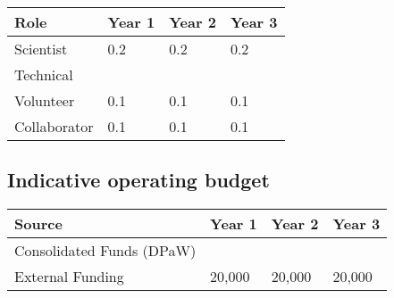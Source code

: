 \documentclass[version=last,
    paper=a4, %
    10pt, %
    usenames,
    dvipsnames,
    oneside, %
    headings=openany, %
    DIV=15 %
]{scrbook}
\begin{document}
\begin{longtabu} to \linewidth { |  X | X | X | X | }
\hline
{}
Role & Year 1 & Year 2 & Year 3\\
\hline
\endhead



Scientist & 0.2 & 0.2 & 0.2\\



Technical &  &  & \\



Volunteer & 0.1 & 0.1 & 0.1\\



Collaborator & 0.1 & 0.1 & 0.1\\


\hline
\end{longtabu}



\subsection*{Indicative operating budget }



\begin{longtabu} to \linewidth { |  X | X | X | X | }
\hline
{}
Source & Year 1 & Year 2 & Year 3\\
\hline
\endhead



Consolidated Funds (DPaW) &  &  & \\



External Funding & 20,000 & 20,000 & 20,000\\


\hline
\end{longtabu}






\end{document}
